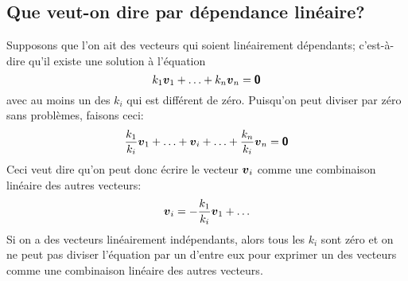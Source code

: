 \subsection{Que veut-on dire par dépendance linéaire?}
Supposons que l'on ait des vecteurs qui soient linéairement
dépendants; c'est-à-dire qu'il existe une solution à l'équation
\[
k_1 \boldsymbol{v}_1 + \ldots + k_n \boldsymbol{v}_n = \mbox{\textsf{\textbf{{0}}}}
\]
avec au moins un des $k_i$ qui est différent de zéro.
Puisqu'on peut diviser par zéro sans problèmes, faisons
ceci:
\[
\frac{k_1}{k_i} \boldsymbol{v}_1 + \ldots + \boldsymbol{v}_i + \ldots + \frac{k_n}{k_i} \boldsymbol{v}_n = \mbox{\textsf{\textbf{{0}}}}
\]
Ceci veut dire qu'on peut donc écrire le vecteur $\boldsymbol{v}_i$
comme une combinaison linéaire des autres vecteurs:
\[
\boldsymbol{v}_i = -\frac{k_1}{k_i} \boldsymbol{v}_1 + \ldots 
\]
Si on a des vecteurs linéairement indépendants, alors
tous les $k_i$ sont zéro et on ne peut pas diviser
l'équation par un d'entre eux pour exprimer un
des vecteurs comme une combinaison linéaire des autres
vecteurs.


